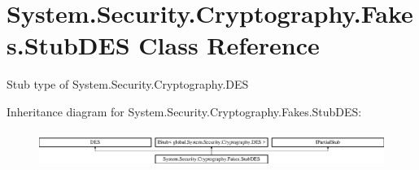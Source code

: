 \hypertarget{class_system_1_1_security_1_1_cryptography_1_1_fakes_1_1_stub_d_e_s}{\section{System.\-Security.\-Cryptography.\-Fakes.\-Stub\-D\-E\-S Class Reference}
\label{class_system_1_1_security_1_1_cryptography_1_1_fakes_1_1_stub_d_e_s}
}


Stub type of System.\-Security.\-Cryptography.\-D\-E\-S 


Inheritance diagram for System.\-Security.\-Cryptography.\-Fakes.\-Stub\-D\-E\-S\-:\begin{figure}[H]
\begin{center}
\leavevmode
\includegraphics[height=1.196581cm]{class_system_1_1_security_1_1_cryptography_1_1_fakes_1_1_stub_d_e_s}
\end{center}
\end{figure}
